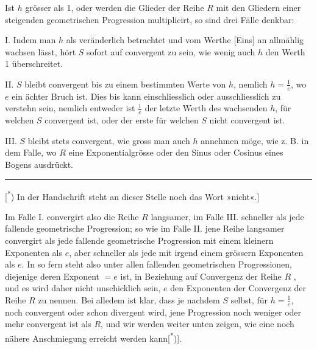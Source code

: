 Ist \(h\) grösser als 1, oder werden die Glieder der Reihe \(R\) mit den Gliedern einer steigenden geometrischen Progression multiplicirt, so sind drei Fälle denkbar:

I. Indem man \(h\) als veränderlich betrachtet und vom Werthe [Eins] an allmählig wachsen lässt, hört \(S\) sofort auf convergent zu sein, wie wenig auch \(h\) den Werth 1 überschreitet.

II. \(S\) bleibt convergent bis zu einem bestimmten Werte von \(h\), nemlich \(h=\frac1e\), wo \(e\) ein ächter Bruch ist. Dies bis kann einschliesslich oder ausschliesslich zu verstehn sein, nemlich entweder ist \(\frac1e\) der letzte Werth des wachsenden \(h\), für welchen \(S\) convergent ist, oder der erste für welchen \(S\) nicht convergent ist.

III. \(S\) bleibt stets convergent, wie gross man auch \(h\) annehmen möge, wie z. B. in dem Falle, wo \(R\) eine Exponentialgrösse oder den Sinus oder Cosinus eines Bogens ausdrückt.
\par\vfill\noindent\rule{.25\linewidth}{.4pt}\par\smallskip
{\footnotesize\noindent\hspace*{\parindent}[\textsuperscript{*}) In der Handschrift steht an dieser Stelle noch das Wort »nicht«.]\par}
\clearpage{}
\noindent\hspace*{\parindent}Im Falle I. convergirt also die Reihe \(R\) langsamer, im Falle III. schneller als jede fallende geometrische Progression; so wie im Falle II. jene Reihe langsamer convergirt als jede fallende geometrische Progression mit einem kleinern Exponenten als \(e\), aber schneller als jede mit irgend einem grössern Exponenten als \(e\). In so fern steht also unter allen fallenden geometrischen Progressionen, diejenige deren Exponent \(=e\) ist, in Beziehung auf Convergenz der Reihe \(R\) , und es wird daher nicht unschicklich sein, \(e\) den Exponenten der Convergenz der Reihe \(R\) zu nennen. Bei alledem ist klar, dass je nachdem \(S\) selbst, für \(h=\frac1e\), noch convergent oder schon divergent wird, jene Progression noch weniger oder mehr convergent ist als \(R\), und wir werden weiter unten zeigen, wie eine noch nähere Anschmiegung erreicht werden kann[\textsuperscript{*})].
\begingroup\makeatletter
\long\def\@makefntext#1{\noindent\hspace*{\parindent}#1}
\endgroup
